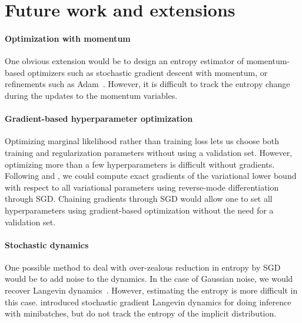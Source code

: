 \documentclass[]{article}
\begin{document}
\section{Future work and extensions}

\paragraph{Optimization with momentum}
One obvious extension would be to design an entropy estimator of 
momentum-based optimizers such as stochastic gradient descent with momentum, or
refinements such as Adam~\citep{Adam14}.
However, it is difficult to track the entropy change during the updates to the momentum variables.


\paragraph{Gradient-based hyperparameter optimization}
Optimizing marginal likelihood rather than training loss lets us choose both training and regularization parameters without using a validation set.
However, optimizing more than a few hyperparameters is difficult without gradients.
Following \citet{domke2012generic} and \citet{MacDuvAda2015hyper}, we could compute exact gradients of the variational lower bound with respect to all variational parameters using reverse-mode differentiation through SGD.
Chaining gradients through SGD would allow one to set all hyperparameters using gradient-based optimization without the need for a validation set.

\paragraph{Stochastic dynamics}
One possible method to deal with over-zealous reduction in entropy by SGD would be to add noise to the dynamics.
In the case of Gaussian noise, we would recover Langevin dynamics~\citep{neal2011mcmc}.
However, estimating the entropy is more difficult in this case.
\citet{welling2011bayesian} introduced stochastic gradient Langevin dynamics for doing inference with minibatches, but do not track the entropy of the implicit distribution.
\end{document}
